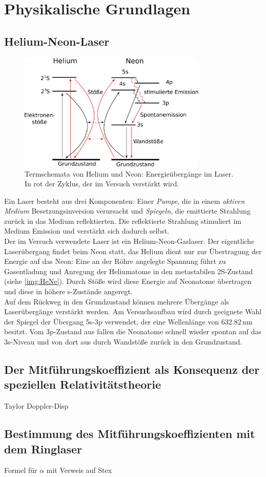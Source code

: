 \section{Physikalische Grundlagen}

\subsection{Helium-Neon-Laser}

\begin{figure}[H]
\begin{center}
  \includegraphics[width=0.8\textwidth]{../img/HeNe.pdf}
  \caption{Termschemata von Helium und Neon: Energieübergänge im Laser.
  In rot der Zyklus, der im Versuch verstärkt wird.}
  \label{img:HeNe}
\end{center}
\end{figure}


Ein Laser besteht aus drei Komponenten: Einer \emph{Pumpe},
die in einem \emph{aktiven Medium} Besetzungsinversion verursacht und \emph{Spiegeln},
die emittierte Strahlung zurück in das Medium reflektierten.
Die reflektierte Strahlung stimuliert im Medium Emission und verstärkt sich dadurch selbst.\\
Der im Versuch verwendete Laser ist ein Helium-Neon-Gaslaser.
Der eigentliche Laserübergang findet beim Neon statt, das Helium dient nur zur Übertragung der Energie
auf das Neon:
Eine an der Röhre angelegte Spannung führt zu Gasentladung und Anregung der Heliumatome
in den metastabilen 2S-Zustand
(siehe \autoref{img:HeNe}).
Durch Stöße wird diese Energie auf Neonatome übertragen und diese in höhere s-Zustände angeregt.\\
Auf dem Rückweg in den Grundzustand können mehrere Übergänge als Laserübergänge verstärkt werden.
Am Versuchsaufbau wird durch geeignete Wahl der Spiegel
der Übergang 5s-3p verwendet, der eine Wellenlänge von 632.82\,nm besitzt.
Vom 3p-Zustand aus fallen die Neonatome schnell wieder spontan auf das 3s-Niveau und von dort aus
durch Wandstöße zurück in den Grundzustand.



\subsection{Der Mitführungskoeffizient als Konsequenz der speziellen Relativitätstheorie}

Taylor
Doppler-Disp


\subsection{Bestimmung des Mitführungskoeffizienten mit dem Ringlaser}


Formel für $\alpha$ mit Verweis auf Stex